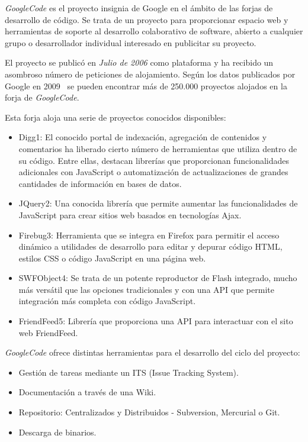 \par \emph{GoogleCode} es el proyecto insignia de Google en el ámbito de las forjas de desarrollo de código. Se trata de un proyecto para proporcionar espacio web y herramientas de soporte al desarrollo colaborativo de software, abierto a cualquier grupo o desarrollador individual interesado en publicitar su proyecto.

\par El proyecto se publicó en \emph{Julio de 2006} como plataforma y ha recibido un asombroso número de peticiones de alojamiento. Según los datos publicados por Google en 2009~\cite{google-code-open} se pueden encontrar más de 250.000 proyectos alojados en la forja de \emph{GoogleCode}.

\par Esta forja aloja una serie de proyectos conocidos disponibles: 

\begin{itemize}
	\item Digg1: El conocido portal de indexación, agregación de contenidos y comentarios ha liberado cierto número de herramientas que utiliza dentro de su código. Entre ellas, destacan librerías que proporcionan funcionalidades adicionales con JavaScript o automatización de actualizaciones de grandes cantidades de información en bases de datos.
	\item JQuery2: Una conocida librería que permite aumentar las funcionalidades de JavaScript para crear sitios web basados en tecnologías Ajax.
	\item Firebug3: Herramienta que se integra en Firefox para permitir el acceso dinámico a utilidades de desarrollo para editar y depurar código HTML, estilos CSS o código JavaScript en una página web.
	\item SWFObject4: Se trata de un potente reproductor de Flash integrado, mucho más versátil que las opciones tradicionales y con una API que permite integración más completa con código JavaScript.
	\item FriendFeed5: Librería que proporciona una API para interactuar con el sito web FriendFeed.
\end{itemize}

\par \emph{GoogleCode} ofrece distintas herramientas para el desarrollo del ciclo del proyecto:

\begin{itemize}
	\item Gestión de tareas mediante un ITS (Issue Tracking System).
	\item Documentación a través de una Wiki.
	\item Repositorio: Centralizados y Distribuidos - Subversion, Mercurial o Git.
	\item Descarga de binarios.
\end{itemize}

